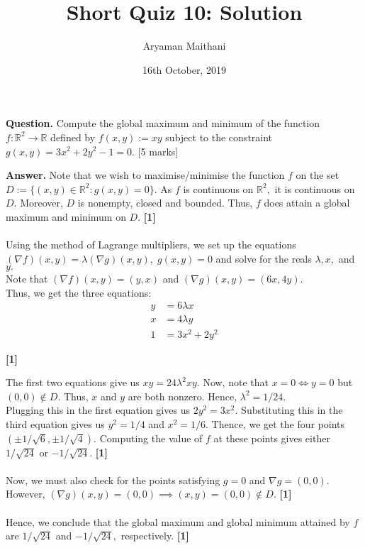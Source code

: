 \documentclass{article}
\title{Short Quiz 10: Solution}      %
\author{Aryaman Maithani}
\date{16th October, 2019}  		 %
\begin{document}
\maketitle

\hrulefill

\textbf{Question.} Compute the global maximum and minimum of the function $f:\mathbb{R}^2\to\mathbb{R}$ defined by $f(x, y) := xy$ subject to the constraint $g(x, y) = 3x^2 + 2y^2 - 1 = 0.$
\hfill [5 marks]
 	
\hrulefill

\textbf{Answer.} Note that we wish to maximise/minimise the function $f$ on the set $D := \{(x, y) \in \mathbb{R}^2 : g(x, y) = 0\}.$ As $f$ is continuous on $\mathbb{R}^2,$ it is continuous on $D.$ Moreover, $D$ is nonempty, closed and bounded. Thus, $f$ does attain a global maximum and minimum on $D.$ \hfill \textbf{[1]}\\~\\
%
Using the method of Lagrange multipliers, we set up the equations $(\nabla f)(x, y) = \lambda(\nabla g)(x, y),\;g(x, y) = 0$ and solve for the reals $\lambda, x,$ and $y.$ \\
Note that $(\nabla f)(x, y) = (y, x)$ and $(\nabla g)(x, y) = (6x, 4y).$\\
Thus, we get the three equations:
\begin{align*}
	y &= 6\lambda x \\
	x &= 4\lambda y \\
	1 &= 3x^2 + 2y^2 
\end{align*}
\begin{flushright}
	\textbf{[1]}
\end{flushright}
The first two equations give us $xy = 24\lambda^2xy.$ Now, note that $x = 0 \iff y = 0$ but $(0, 0) \notin D.$ Thus, $x$ and $y$ are both nonzero. Hence, $\lambda^2 = 1/24.$\\
Plugging this in the first equation gives us $2y^2 = 3x^2.$ Substituting this in the third equation gives us $y^2 = 1/4$ and $x^2 = 1/6.$ Thence, we get the four points $(\pm 1/\sqrt{6}, \pm 1/\sqrt{4}).$ Computing the value of $f$ at these points gives either $1/\sqrt{24}$ or $-1/\sqrt{24}.$ \hfill \textbf{[1]}\\~\\
Now, we must also check for the points satisfying $g = 0$ and $\nabla g = (0, 0).$  \\
However, $(\nabla g)(x, y) = (0, 0) \implies (x, y) = (0, 0) \notin D.$ \hfill \textbf{[1]}\\~\\
Hence, we conclude that the global maximum and global minimum attained by $f$ are $1/\sqrt{24}$ and $-1/\sqrt{24},$ respectively. \hfill \textbf{[1]}
\end{document}
